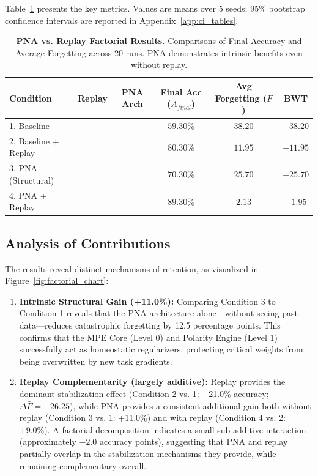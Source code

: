 \documentclass[11pt]{article}
\newcommand{\cmark}{\ding{51}}
\newcommand{\xmark}{\ding{55}}
\begin{document}
Table~\ref{tab:factorial_results} presents the key metrics. Values are means over 5 seeds; 95\% bootstrap confidence intervals are reported in Appendix~\ref{app:ci_tables}.

\begin{table}[h]
    \centering
    \caption{\textbf{PNA vs. Replay Factorial Results.} Comparisons of Final Accuracy and Average Forgetting across 20 runs. PNA demonstrates intrinsic benefits even without replay.}
    \label{tab:factorial_results}
    \begin{tabular}{lccccc}
        \toprule
        \textbf{Condition} & \textbf{Replay} & \textbf{PNA Arch} & \textbf{Final Acc} ($\bar{A}_{final}$) & \textbf{Avg Forgetting} ($\bar{F}$) & \textbf{BWT} \\
        \midrule
        1. Baseline & \xmark & \xmark & $59.30\%$ & $38.20$ & $-38.20$ \\
        2. Baseline + Replay & \cmark & \xmark & $80.30\%$ & $11.95$ & $-11.95$ \\
        3. PNA (Structural) & \xmark & \cmark & $70.30\%$ & $25.70$ & $-25.70$ \\
        4. PNA + Replay & \cmark & \cmark & $\mathbf{89.30\%}$ & $\mathbf{2.13}$ & $\mathbf{-1.95}$ \\
        \bottomrule
    \end{tabular}
\end{table}

\subsection{Analysis of Contributions}

The results reveal distinct mechanisms of retention, as visualized in Figure~\ref{fig:factorial_chart}:

\begin{enumerate}
    \item \textbf{Intrinsic Structural Gain (+11.0\%):} Comparing Condition 3 to Condition 1 reveals that the PNA architecture alone—without seeing past data—reduces catastrophic forgetting by 12.5 percentage points. This confirms that the MPE Core (Level 0) and Polarity Engine (Level 1) successfully act as homeostatic regularizers, protecting critical weights from being overwritten by new task gradients.

    \item \textbf{Replay Complementarity (largely additive):} Replay provides the dominant stabilization effect (Condition 2 vs. 1: +21.0\% accuracy; $\Delta\bar{F}=-26.25$), while PNA provides a consistent additional gain both without replay (Condition 3 vs. 1: +11.0\%) and with replay (Condition 4 vs. 2: +9.0\%). A factorial decomposition indicates a small sub-additive interaction (approximately $-2.0$ accuracy points), suggesting that PNA and replay partially overlap in the stabilization mechanisms they provide, while remaining complementary overall.
\end{enumerate}
\end{document}
